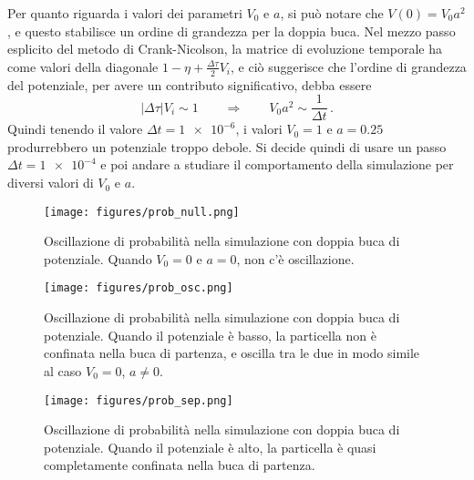 \documentclass[a4paper, titlepage]{article}
\numberwithin{equation}{section}
\begin{document}
Per quanto riguarda i valori dei parametri $V_0$ e $a$, si può notare che $V(0) = V_0 a^2$, e questo stabilisce un ordine di grandezza per la doppia buca. Nel mezzo passo esplicito del metodo di Crank-Nicolson, la matrice di evoluzione temporale ha come valori della diagonale $1-\eta + \frac{\Delta\tau}{2} V_i$, e ciò suggerisce che l'ordine di grandezza del potenziale, per avere un contributo significativo, debba essere
\begin{equation}
    |\Delta\tau| V_i \sim 1 
    \qquad \Rightarrow \qquad
    V_0 a^2 \sim \frac{1}{\Delta t}\, .
    \label{eq:extim}
\end{equation}
Quindi tenendo il valore $\Delta t = \num{1e-6}$, i valori $V_0 = 1$ e $a = 0.25$ produrrebbero un potenziale troppo debole. Si decide quindi di usare un passo $\Delta t = \num{1e-4}$ e poi andare a studiare il comportamento della simulazione per diversi valori di $V_0$ e $a$.
\begin{figure}[h!]
    \centering
    \begin{minipage}[t]{0.47 \textwidth}
        \centering
        \texttt{[image: figures/prob\_null.png]}
        \caption{Oscillazione di probabilità nella simulazione con doppia buca di potenziale. Quando $V_0 = 0$ e $a = 0$, non c'è oscillazione.}
        \label{fig:prob_null}
    \end{minipage}
    \hspace{0.02\textwidth}
    \begin{minipage}[t]{0.47 \textwidth}
        \centering
        \texttt{[image: figures/prob\_osc.png]}
        \caption{Oscillazione di probabilità nella simulazione con doppia buca di potenziale. Quando il potenziale è basso, la particella non è confinata nella buca di partenza, e oscilla tra le due in modo simile al caso $V_0 = 0$, $a \neq 0$.}
        \label{fig:prob_osc}
    \end{minipage}
\end{figure}
\vspace{-0.5cm}
\begin{figure}[h!]
    \centering
    \begin{minipage}{0.47 \textwidth}
        \centering
        \texttt{[image: figures/prob\_sep.png]}
        \caption{Oscillazione di probabilità nella simulazione con doppia buca di potenziale. Quando il potenziale è alto, la particella è quasi completamente confinata nella buca di partenza.}
        \label{fig:prob_sep}
    \end{minipage}
    \hspace{0.02\textwidth}
    \begin{minipage}{0.47 \textwidth}
    \end{minipage}
\end{figure}
\end{document}

